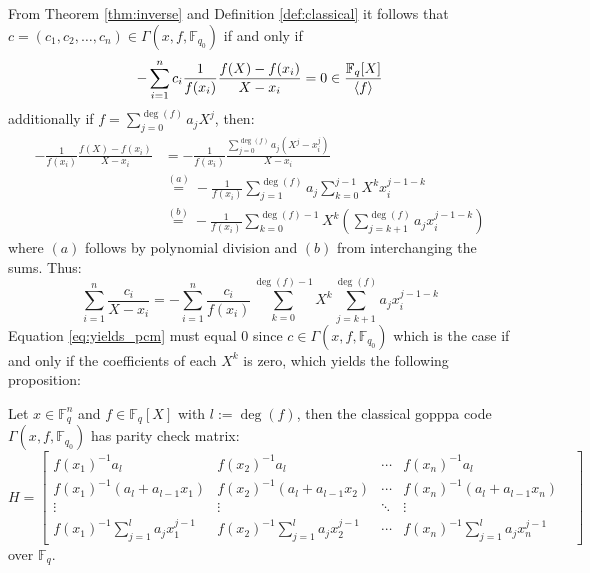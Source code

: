 From Theorem \ref{thm:inverse} and Definition \ref{def:classical} it follows that $c = (c_1, c_2, \ldots, c_{n}) \in \Gamma(x, f, \mathbb{F}_{q_0})$ if and only if
\begin{equation}\label{eq:condtion_on_coef}
  -\sum_{i = 1}^n c_i \frac{1}{f(x_i)} \frac{f(X) - f(x_i)}{X - x_i} = 0 \in \frac{\mathbb{F}_{q}[X]}{\langle f\rangle}
\end{equation}
additionally if $f = \sum_{j = 0}^{\deg(f)} a_j X^j$, then:
\begin{align*}
  -\frac{1}{f(x_i)}\frac{f(X) - f(x_i)}{X - x_{i}} &= -\frac{1}{f(x_{i})} \frac{\sum_{j=0}^{\deg(f)} a_{j}(X^j - x_i^j)}{X - x_i} \\ &\stackrel{(a)}= -\frac{1}{f(x_i)} \sum^{\deg(f)}_{j = 1} a_j \sum^{j - 1}_{k = 0} X^k x_i^{j - 1 - k}\\
  &\stackrel{(b)}= -\frac{1}{f(x_{i})} \sum^{\deg(f) - 1}_{k = 0} X^k \left(\sum^{\deg(f)}_{j = k + 1} a_j x_i^{j - 1 - k}\right)
\end{align*}
where $(a)$ follows by polynomial division and $(b)$ from interchanging the sums. Thus:
\begin{equation}\label{eq:yields_pcm}
  \sum_{i = 1}^n \frac{c_i}{X - x_i} = -\sum^n_{i = 1} \frac{c_{i}}{f(x_{i})} \sum_{k = 0}^{\deg(f) - 1} X^k \sum_{j = k + 1}^{\deg(f)} a_j x_i^{j - 1 - k}
\end{equation}
Equation \eqref{eq:yields_pcm} must equal $0$ since $c \in \Gamma(x, f, \mathbb{F}_{q_0})$ which is the case if and only if the coefficients of each $X^k$ is zero, which yields the following proposition:
\begin{proposition}\label{prop:pcm_classical_goppa}
  Let $x \in \mathbb{F}_q^n$ and $f \in \mathbb{F}_q[X]$ with $l := \deg(f)$, then the classical gopppa code $\Gamma(x, f, \mathbb{F}_{q_0})$ has parity check matrix:
  \begin{equation*}
    H = \begin{bmatrix}
          f(x_{1})^{-1} a_{l} & f(x_{2})^{-1} a_{l} & \cdots & f(x_{n})^{-1} a_{l} \\
          f(x_{1})^{-1} (a_{l} + a_{l - 1}x_1) & f(x_{2})^{-1} (a_{l} + a_{l - 1}x_2) & \cdots & f(x_{n})^{-1} (a_{l} + a_{l - 1}x_n) \\
          \vdots & \vdots & \ddots & \vdots \\
          f(x_{1})^{-1} \sum_{j = 1}^l a_j x_1^{j -  1} & f(x_{2})^{-1} \sum_{j = 1}^l a_j x_2^{j -  1} & \cdots & f(x_{n})^{-1} \sum_{j = 1}^l a_j x_n^{j -  1} &
        \end{bmatrix}
  \end{equation*}
  over $\mathbb{F}_q$.
\end{proposition}
